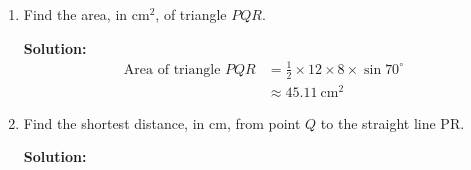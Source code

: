 \documentclass{report}
\newcommand{\sol}{\textbf{Solution:}}
\begin{document}
\begin{enumerate}[leftmargin=*]
\begin{enumerate}
\begin{enumerate}
                        \item $\angle P R S$.

                              \sol{}
                              \begin{align*}
                                  \angle PSR                      & = 180^{\circ} - 70^{\circ}                  \\
                                                                  & = 110^{\circ}                               \\
                                  \dfrac{PR}{\sin \angle PSR}     & = \dfrac{RS}{\sin \angle SPR}               \\
                                  \dfrac{11.93}{\sin 110^{\circ}} & = \dfrac{6}{\sin \angle SPR}                \\
                                  \sin \angle SPR                 & = \dfrac{6 \sin 110^{\circ}}{11.93}         \\
                                                                  & \approx 0.47                                \\
                                  \angle SPR                      & \approx 28.20^{\circ}                       \\
                                  \angle PRS                      & = 180^{\circ} - 110^{\circ} - 28.20^{\circ} \\
                                                                  & = 41.80^{\circ}
                              \end{align*}
                    \end{enumerate}

              \item Find the area, in $\mathrm{cm}^2$, of triangle $P Q R$.

                    \sol{}
                    \begin{align*}
                        \text{Area of triangle } PQR & = \frac{1}{2} \times 12 \times 8 \times \sin 70^{\circ} \\
                                                     & \approx 45.11 \mathrm{~cm}^2
                    \end{align*}

              \item Find the shortest distance, in $\mathrm{cm}$, from point $Q$ to the straight
                    line PR.

                    \sol{}


\end{enumerate}
\end{enumerate}
\end{document}
